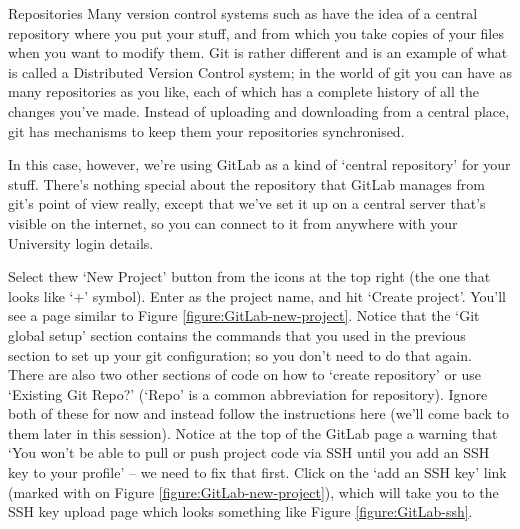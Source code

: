 \begin{diversion}{Repositories}
Many version control systems such as  have the idea of a central repository where you put your stuff, and from which you take copies of your files when you want to modify them. Git is rather different and is an example of what is called a Distributed Version Control system; in the world of git you can have as many repositories as you like, each of which has a complete history of all the changes you've made. Instead of uploading and downloading from a central place, git has mechanisms to keep them your repositories synchronised. 

In this case, however, we're using GitLab as a kind of `central repository' for your stuff. There's nothing special about the repository that GitLab manages from git's point of view really, except that we've set it up on a central server that's visible on the internet, so you can connect to it from anywhere with your University login details.
\end{diversion}

Select thew `New Project' button from the icons at the top right (the one that looks like `+' symbol). Enter  as the project name, and hit `Create project'. You'll see a page similar to Figure \ref{figure:GitLab-new-project}. Notice that the `Git global setup' section contains the commands that you used in the previous section to set up your git configuration; so you don't need to do that again. There are also two other sections of code on how to `create repository' or use `Existing Git Repo?' (`Repo' is a common abbreviation for repository). Ignore both of these for now and instead follow the instructions here (we'll come back to them later in this session). Notice at the top of the GitLab page a warning that `You won't be able to pull or push project code via SSH until you add an SSH key to your profile' -- we need to fix that first. Click on the `add an SSH key' link (marked with \protect{} on Figure \ref{figure:GitLab-new-project}), which will take you to the SSH key upload page which looks something like Figure \ref{figure:GitLab-ssh}.

